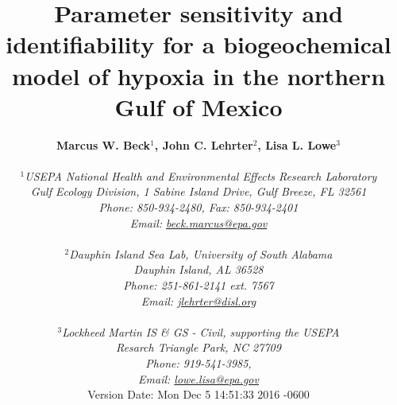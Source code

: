 \documentclass[letterpaper,12pt,oneside]{article}\usepackage[]{graphicx}\usepackage[]{color}
\begin{document}
\raggedbottom
\linenumbers
\raggedright
{}
\setlength{\parindent}{0.5in}
\renewcommand\refname{References \vspace{12pt}}

\begin{singlespace}
\title{{\bf {\Large Parameter sensitivity and identifiability for a biogeochemical model of hypoxia in the northern {G}ulf of {M}exico}}}
\author{
  {\bf {\normalsize Marcus W. Beck$^1$, John C. Lehrter$^2$, Lisa L. Lowe$^3$}}
  \\\\{\textit {\normalsize $^1$USEPA National Health and Environmental Effects Research Laboratory}}
  \\{\textit {\normalsize Gulf Ecology Division, 1 Sabine Island Drive, Gulf Breeze, FL 32561}}
	\\{\textit {\normalsize Phone: 850-934-2480, Fax: 850-934-2401}}
	\\{\textit {\normalsize Email: \href{mailto:beck.marcus@epa.gov}{beck.marcus@epa.gov}}}
	  \\\\{\textit {\normalsize $^2$Dauphin Island Sea Lab, University of South Alabama}}
  \\{\textit {\normalsize Dauphin Island, AL 36528}}
	\\{\textit {\normalsize Phone: 251-861-2141 ext. 7567}}
	\\{\textit {\normalsize Email: \href{mailto:jlehrter@disl.org}{jlehrter@disl.org}}}
	\\\\{\textit {\normalsize $^3$Lockheed Martin IS \& GS - Civil, supporting the USEPA}}
	\\{\textit {\normalsize Resarch Triangle Park, NC 27709}}
	\\{\textit {\normalsize Phone: 919-541-3985,}}
	\\{\textit {\normalsize Email: \href{mailto:lowe.lisa@epa.gov}{lowe.lisa@epa.gov}}}
  \vspace{1in} 
  \\ Version Date:   Mon Dec 5 14:51:33 2016 -0600
	}
\date{}
\maketitle
\end{singlespace}
\clearpage
\end{document}
